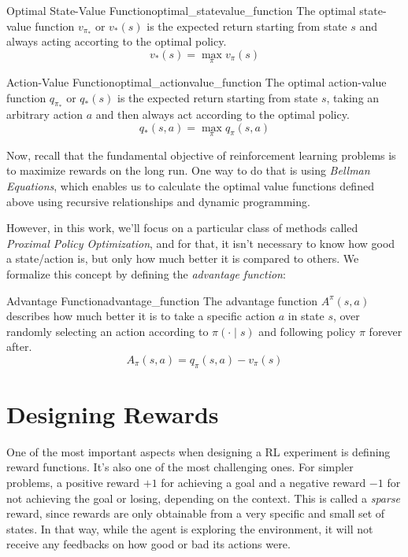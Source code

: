 \begin{definition}{Optimal State-Value Function}{optimal_statevalue_function}
      The optimal state-value function $v_{\pi_*}$ or $v_*(s)$ is the expected return starting from state $s$ and always acting accorting to the optimal policy.
      \[
            v_*(s) = \max_\pi v_\pi(s)      
      \]
\end{definition}

\begin{definition}{Action-Value Function}{optimal_actionvalue_function}
      The optimal action-value function $q_{\pi_*}$ or $q_*(s)$ is the expected return starting from state $s$, taking an arbitrary action $a$ and then always act according to the optimal policy.
      \[
            q_*(s, a) = \max_\pi q_\pi(s, a)      
      \]
\end{definition}

Now, recall that the fundamental objective of reinforcement learning problems is to maximize rewards on the long run. One way to do that is using \textit{Bellman Equations}, which enables us to calculate the optimal value functions defined above using recursive relationships and dynamic programming.

However, in this work, we'll focus on a particular class of methods called \textit{Proximal Policy Optimization}, and for that, it isn't necessary to know how good a state/action is, but only how much better it is compared to others. We formalize this concept by defining the \textit{advantage function}:

\begin{definition}{Advantage Function}{advantage_function}
      The advantage function $A^{\pi}(s,a)$ describes how much better it is to take a specific action $a$ in state $s$, over randomly selecting an action according to $\pi(\cdot \mid s)$ and following policy $\pi$ forever after.
      \[
            A_\pi(s, a) = q_\pi(s, a) - v_\pi(s)      
      \]
\end{definition}

\section{Designing Rewards}\label{sec:rewards}
One of the most important aspects when designing a RL experiment is defining reward functions. It's also one of the most challenging ones. For simpler problems, a positive reward $+1$ for achieving a goal and a negative reward $-1$ for not achieving the goal or losing, depending on the context. This is called a \textit{sparse} reward, since rewards are only obtainable from a very specific and small set of states. In that way, while the agent is exploring the environment, it will not receive any feedbacks on how good or bad its actions were.

